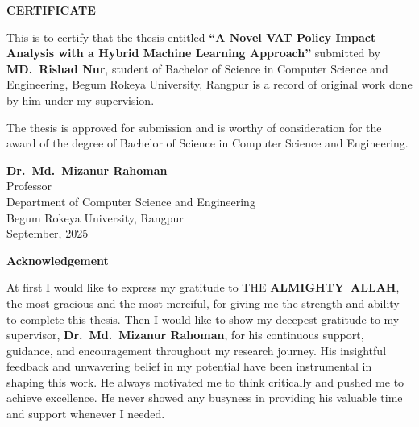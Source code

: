 \newpage
\thispagestyle{empty}
\vspace*{2cm}

\begin{center}
    {\Large\bfseries CERTIFICATE}
\end{center}

\vspace{1cm}

This is to certify that the thesis entitled \textbf{``A Novel VAT Policy Impact Analysis with a Hybrid Machine Learning Approach''} submitted by \textbf{MD.\ Rishad Nur}, student of Bachelor of Science in Computer Science and Engineering, Begum Rokeya University, Rangpur is a record of original work done by him under my supervision.

\vspace{1cm}

The thesis is approved for submission and is worthy of consideration for the award of the degree of Bachelor of Science in Computer Science and Engineering.

\vspace{3cm}

\begin{flushright}
    \textbf{Dr.\ Md.\ Mizanur Rahoman}\\
    Professor\\
    Department of Computer Science and Engineering\\
    Begum Rokeya University, Rangpur\\
    September, 2025
\end{flushright}

\newpage
\thispagestyle{empty}
\vspace*{2cm}

\begin{center}
    {\Large\bfseries Acknowledgement}
\end{center}

\vspace{1cm}

At first I would like to express my gratitude to THE \textbf{ALMIGHTY\ ALLAH}, the most gracious and the most merciful, for giving me the strength and ability to complete this thesis. Then I would like to show my deeepest gratitude to my supervisor, \textbf {Dr.\ Md.\ Mizanur Rahoman}, for his continuous support, guidance, and encouragement throughout my research journey. His insightful feedback and unwavering belief in my potential have been instrumental in shaping this work. He always motivated me to think critically and pushed me to achieve excellence. He never showed any busyness in providing his valuable time and support whenever I needed.

